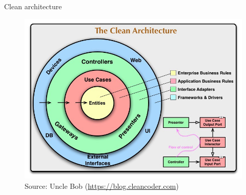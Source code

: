 \documentclass{beamer}
\begin{document}
\begin{frame}{Clean architecture}


 \begin{figure}
 \includegraphics[width=.9\textwidth]{pics/Clean_architecture_circle.jpeg}
\caption{Source: Uncle Bob (\url{https://blog.cleancoder.com})}
\end{figure} 

\end{frame}
\end{document}
